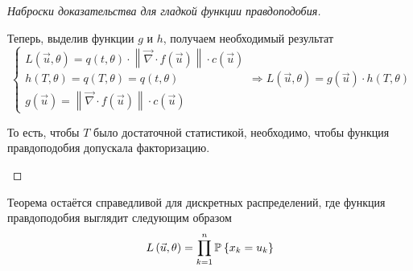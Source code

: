 \begin{proof}[Наброски доказательства для гладкой функции правдоподобия]
\begin{enumerate}
      Теперь, выделив функции $g$ и $h$, получаем необходимый результат
      $$\begin{cases}
      L\left( \vec{u}, \theta \right)
    = q\left( t, \theta \right)
        \cdot \left\| \vec{\nabla}
    \cdot f\left( \vec{u} \right) \right\|
    \cdot c\left( \vec{u} \right) \\
      h\left( T, \theta \right)
    = q\left( T, \theta \right)
    = q\left( t, \theta \right) \\
      g\left( \vec{u} \right)
    = \left\| \vec{\nabla}
    \cdot f\left( \vec{u} \right) \right\|
        \cdot c\left( \vec{u} \right)
      \end{cases}
      \Rightarrow
      L\left( \vec{u}, \theta \right)
    = g\left( \vec{u} \right) \cdot h\left( T, \theta \right)$$

     То есть, чтобы $T$ было достаточной статистикой, необходимо, чтобы
     функция правдоподобия допускала факторизацию.
  \end{enumerate}
\end{proof}

\begin{remark}
  Теорема остаётся справедливой для дискретных распределений,
  где функция правдоподобия выглядит следующим образом
  $$L\left( \vec{u}, \theta \right) = \prod_{k=1}^n \mathbb{P}_{{}}\left\{ x_k = u_k \right\}$$
\end{remark}

